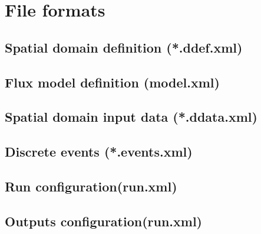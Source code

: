 \chapter{File formats}

\section{Spatial domain definition (*.ddef.xml)}

\section{Flux model definition (model.xml)}

\section{Spatial domain input data (*.ddata.xml)}

\section{Discrete events (*.events.xml)}

\section{Run configuration(run.xml)}

\section{Outputs configuration(run.xml)}
